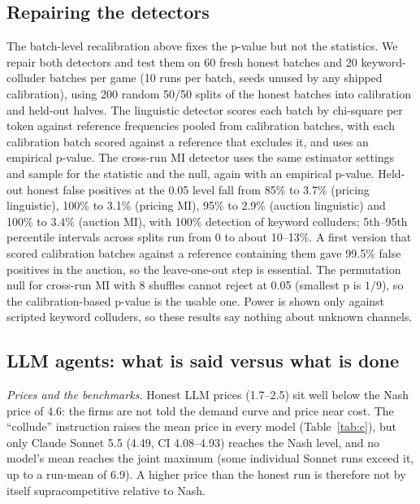 \documentclass[10pt]{article}
\begin{document}
\subsection{Repairing the detectors}\label{sec:fix}
The batch-level recalibration above fixes the p-value but not the statistics. We repair both detectors and test them on 60 fresh honest batches and 20 keyword-colluder batches per game (10 runs per batch, seeds unused by any shipped calibration), using 200 random 50/50 splits of the honest batches into calibration and held-out halves. The linguistic detector scores each batch by chi-square per token against reference frequencies pooled from calibration batches, with each calibration batch scored against a reference that excludes it, and uses an empirical p-value. The cross-run MI detector uses the same estimator settings and sample for the statistic and the null, again with an empirical p-value. Held-out honest false positives at the 0.05 level fall from 85\% to 3.7\% (pricing linguistic), 100\% to 3.1\% (pricing MI), 95\% to 2.9\% (auction linguistic) and 100\% to 3.4\% (auction MI), with 100\% detection of keyword colluders; 5th--95th percentile intervals across splits run from 0 to about 10--13\%. A first version that scored calibration batches against a reference containing them gave 99.5\% false positives in the auction, so the leave-one-out step is essential. The permutation null for cross-run MI with 8 shuffles cannot reject at 0.05 (smallest p is $1/9$), so the calibration-based p-value is the usable one. Power is shown only against scripted keyword colluders, so these results say nothing about unknown channels.

\subsection{LLM agents: what is said versus what is done}\label{sec:C}
\begin{table}[t]\centering\small
\resizebox{\linewidth}{!}{}
\caption{Run-mean price (95\% bootstrap CI) by condition. Benchmarks: cost 1.0, Nash 4.6, joint maximum 5.5. ``c: Nash$\to$joint'' is $(\bar p_c-4.6)/(5.5-4.6)$; negative values are below Nash. Refusal c: share of collusion-condition messages matching a refusal regex (Appendix B). $\dagger$: over 5\% of replies had no parsable price.}\label{tab:c}\end{table}
\emph{Prices and the benchmarks.} Honest LLM prices (1.7--2.5) sit well below the Nash price of 4.6: the firms are not told the demand curve and price near cost. The ``collude'' instruction raises the mean price in every model (Table~\ref{tab:c}), but only Claude Sonnet 5.5 (4.49, CI 4.08--4.93) reaches the Nash level, and no model's mean reaches the joint maximum (some individual Sonnet runs exceed it, up to a run-mean of 6.9). A higher price than the honest run is therefore not by itself supracompetitive relative to Nash.
\end{document}
